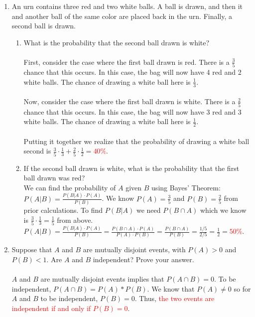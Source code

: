 \documentclass{article}
\newcommand{\intersect}{\cap}
\begin{document}
\begin{enumerate}
        \item An urn contains three red and two white balls. A ball is drawn, and then it and another ball of the same color are placed back in the urn. Finally, a second ball is drawn.
        \begin{enumerate}
            \item What is the probability that the second ball drawn is white?\\\\
            First, consider the case where the first ball drawn is red. There is a $\frac{3}{5}$ chance that this occurs. In this case, the bag will now have 4 red and 2 white balls. The chance of drawing a white ball here is $\frac{1}{3}$.\\\\
            Now, consider the case where the first ball drawn is white. There is a $\frac{2}{5}$ chance that this occurs. In this case, the bag will now have 3 red and 3 white balls. The chance of drawing a white ball here is $\frac{1}{2}$.\\\\
            Putting it together we realize that the probability of drawing a white ball second is $\frac{3}{5}\cdot\frac{1}{3}+\frac{2}{5}\cdot\frac{1}{2}=$\textcolor{red}{$40\%$}.
            \item If the second ball drawn is white, what is the probability that the first ball drawn was red?\\
            We can find the probability of $A$ given $B$ using Bayes' Theorem: $P(A|B)=\frac{P(B|A) \cdot P(A)}{P(B)}$. We know $P(A)=\frac{3}{5}$ and $P(B)=\frac{2}{5}$ from prior calculations. To find  $P(B|A)$ we need $P(B\intersect A)$ which we know is $\frac{3}{5}\cdot\frac{1}{3}=\frac{1}{5}$ from above. $P(A|B)=\frac{P(B|A) \cdot P(A)}{P(B)}=\frac{P(B \intersect A) \cdot P(A)}{P(A) \cdot P(B)}=\frac{P(B \intersect A)}{P(B)}=\frac{1/5}{2/5}=\frac{1}{2}=$\textcolor{red}{$50\%$}.
        \end{enumerate}
\pagebreak
        \item Suppose that $A$ and $B$ are mutually disjoint events, with $P(A) > 0$ and $P(B) < 1$. Are $A$ and $B$ independent? Prove your answer.\\\\
            $A$ and $B$ are mutually disjoint events implies that $P(A \intersect B) = 0$.
            To be independent, $P(A \intersect B) = P(A)*P(B)$. We know that $P(A) \neq 0$ so for $A$ and $B$ to be independent, $P(B)=0$. Thus, \textcolor{red}{the two events are independent if and only if $P(B)=0$}.

\end{enumerate}
\end{document}

